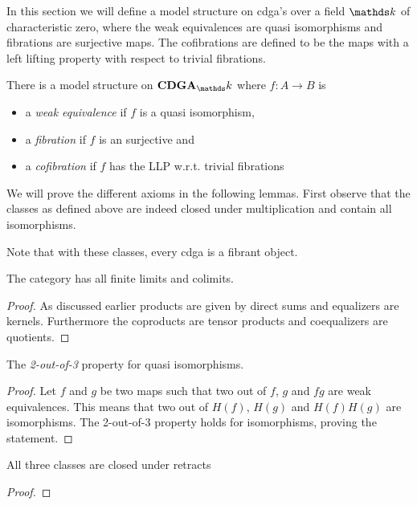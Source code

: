 
In this section we will define a model structure on cdga's over a field $\k$ of characteristic zero, where the weak equivalences are quasi isomorphisms and fibrations are surjective maps. The cofibrations are defined to be the maps with a left lifting property with respect to trivial fibrations.

\begin{proposition}
	There is a model structure on $\CDGA_\k$ where $f: A \to B$ is
	\begin{itemize}
		\item a \emph{weak equivalence} if $f$ is a quasi isomorphism,
		\item a \emph{fibration} if $f$ is an surjective and
		\item a \emph{cofibration} if $f$ has the LLP w.r.t. trivial fibrations
	\end{itemize}
\end{proposition}

We will prove the different axioms in the following lemmas. First observe that the classes as defined above are indeed closed under multiplication and contain all isomorphisms.

Note that with these classes, every cdga is a fibrant object.

\begin{lemma}
	[MC1] The category has all finite limits and colimits.
\end{lemma}
\begin{proof}
	As discussed earlier products are given by direct sums and equalizers are kernels. Furthermore the coproducts are tensor products and coequalizers are quotients.
\end{proof}

\begin{lemma}
	[MC2] The \emph{2-out-of-3} property for quasi isomorphisms.
\end{lemma}
\begin{proof}
	Let $f$ and $g$ be two maps such that two out of $f$, $g$ and $fg$ are weak equivalences. This means that two out of $H(f)$, $H(g)$ and $H(f)H(g)$ are isomorphisms. The 2-out-of-3 property holds for isomorphisms, proving the statement.
\end{proof}

\begin{lemma}
	[MC3] All three classes are closed under retracts
\end{lemma}
\begin{proof}
\end{proof}

